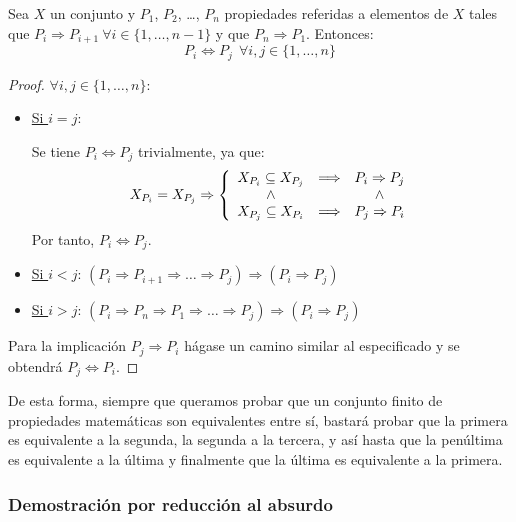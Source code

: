 \begin{prop}
    Sea $X$ un conjunto y $P_1$, $P_2$, \ldots, $P_n$ propiedades referidas a elementos de $X$ tales que $P_i \Longrightarrow P_{i+1}~\forall i \in \{1, \ldots, n-1\}$ y que $P_n \Longrightarrow P_1$. Entonces:
    $$P_i \Longleftrightarrow P_j~~\forall i, j \in \{1, \ldots, n\}$$
\end{prop}
\begin{proof}
    $\forall i,j \in \{1, \ldots, n\}$:
    \begin{itemize}
        \item \underline{Si $i = j$}:

        Se tiene $P_i \Leftrightarrow P_j$ trivialmente, ya que:
        \begin{equation*}
            X_{P_i} = X_{P_j} \Rightarrow \left\{
            \begin{array}{ccc}
                X_{P_i} \subseteq X_{P_j} & \Longrightarrow & P_i \Rightarrow P_j \\
                \ \land \  && \ \land \ \\
                X_{P_j} \subseteq X_{P_i} & \Longrightarrow & P_j \Rightarrow P_i
            \end{array}
            \right.
        \end{equation*}
        Por tanto, $P_i \Leftrightarrow P_j$.

        \item \underline{Si $i < j$}: $(P_i \Rightarrow P_{i+1} \Rightarrow \ldots \Rightarrow P_j) \Rightarrow (P_i \Rightarrow P_j)$

        \item \underline{Si $i > j$}: $(P_i \Rightarrow P_n \Rightarrow P_1 \Rightarrow \ldots \Rightarrow P_j) \Rightarrow (P_i \Rightarrow P_j)$
    \end{itemize}
    
    Para la implicación $P_j \Rightarrow P_i$ hágase un camino similar al especificado y se obtendrá $P_j \Leftrightarrow P_i$.
\end{proof}
De esta forma, siempre que queramos probar que un conjunto finito de propiedades matemáticas son equivalentes entre sí, bastará probar que la primera es equivalente a la segunda, la segunda a la tercera, y así hasta que la penúltima es equivalente a la última y finalmente que la última es equivalente a la primera.

\subsubsection{Demostración por reducción al absurdo}


